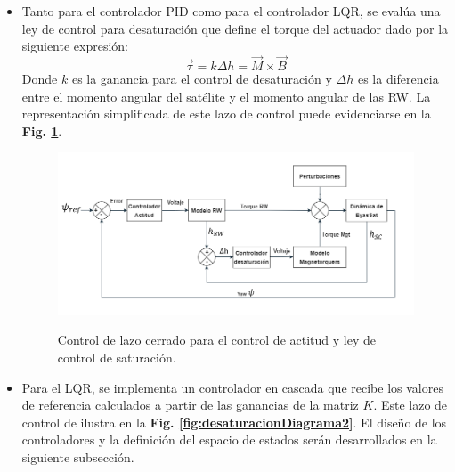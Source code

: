 \begin{itemize}
	 \item Tanto para el controlador PID como para el controlador LQR, se evalúa una ley de control para desaturación que define el torque del actuador dado por la siguiente expresión:
	 	\begin{equation}\label{eq:ley_de_control_sat}
	 		\vec{\tau} = k\Delta h =\vec{M}\times\vec{B} 
	 	\end{equation} 
	 Donde $k$ es la ganancia para el control de desaturación y $\Delta h$ es la diferencia entre el momento angular del satélite y el momento angular de las RW. La representación simplificada de este lazo de control puede evidenciarse en la \textbf{Fig. \ref{fig:desaturacionDiagrama}}.
	 
	 \begin{figure}[!ht]
	 	\begin{center}
	 		\includegraphics[scale=0.55]{imagenes/controladores/Diagrama_controlador.PNG}\\
	 	\end{center}
	 	\caption{Control de lazo cerrado para el control de actitud y ley de control de saturación.}
	 	\label{fig:desaturacionDiagrama}	 	
	 \end{figure}
	 
	 \item Para el LQR, se implementa un controlador en cascada que recibe los valores de referencia calculados a partir de las ganancias de la matriz $K$. Este lazo de control de ilustra en la \textbf{Fig. \ref{fig:desaturacionDiagrama2}}. El diseño de los controladores y la definición del espacio de estados serán desarrollados en la siguiente subsección.  
	 

\end{itemize}
